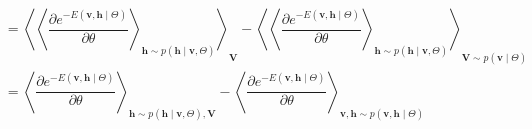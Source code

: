 \documentclass[11pt,twoside,a4paper]{article}
\begin{document}
\begin{appendices}
\begin{equation}
\begin{aligned}
		& = \left \langle \left \langle \dfrac{\partial e^{-E(\mathbf{v}, \mathbf{h} \mid \Theta)}}{\partial \theta} \right \rangle_{\mathbf{h} \sim p( \mathbf{h} \mid \mathbf{v}, \Theta)} \right \rangle_{\mathbf{V}}
		- \left \langle \left \langle \dfrac{\partial e^{-E(\mathbf{v}, \mathbf{h} \mid \Theta)}}{\partial \theta} \right \rangle_{\mathbf{h} \sim p( \mathbf{h} \mid \mathbf{v}, \Theta)} \right \rangle_{\mathbf{V} \sim p(\mathbf{v} \mid \Theta)}  \\
		& = \left \langle \dfrac{\partial e^{-E(\mathbf{v}, \mathbf{h} \mid \Theta)}}{\partial \theta} \right \rangle_{\mathbf{h} \sim p( \mathbf{h} \mid \mathbf{v}, \Theta), \mathbf{V}} 
		- \left \langle \dfrac{\partial e^{-E(\mathbf{v}, \mathbf{h} \mid \Theta)}}{\partial \theta} \right \rangle_{\mathbf{v}, \mathbf{h} \sim p( \mathbf{v}, \mathbf{h} \mid  \Theta)}  \\
		\end{aligned}
	\end{equation}
\end{appendices}
 

\end{document}
